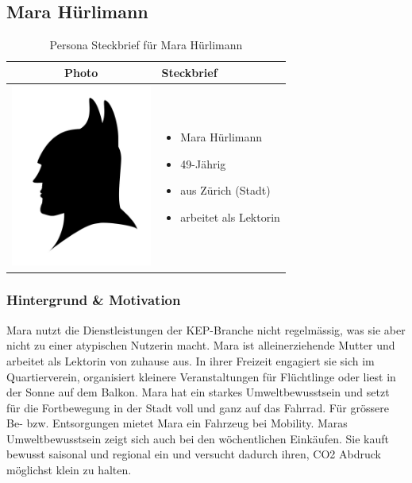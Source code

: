 \subsection{Mara Hürlimann}

\begin{table}[h!]
  \centering
  \begin{tabular}{ | c | m{5cm} | }
    \hline
    Photo & Steckbrief \\ \hline
    \begin{minipage}{.3\textwidth}
      \includegraphics[width=\linewidth, height=60mm]{images/batman.jpg}
    \end{minipage}
    &
      \begin{itemize}
        \item Mara Hürlimann
        \item 49-Jährig
        \item aus Zürich (Stadt)
        \item arbeitet als Lektorin
      \end{itemize}
    \\ \hline
  \end{tabular}
  \caption{Persona Steckbrief für Mara Hürlimann}\label{tbl:steckbriefmara}
\end{table}

\subsubsection{Hintergrund \& Motivation}
Mara nutzt die Dienstleistungen der KEP-Branche nicht regelmässig, was sie aber nicht zu einer atypischen Nutzerin macht. Mara ist alleinerziehende Mutter und arbeitet als Lektorin von zuhause aus. In ihrer Freizeit engagiert sie sich im Quartierverein, organisiert kleinere Veranstaltungen für Flüchtlinge oder liest in der Sonne auf dem Balkon. Mara hat ein starkes Umweltbewusstsein und setzt für die Fortbewegung in der Stadt voll und ganz auf das Fahrrad. Für grössere Be- bzw. Entsorgungen mietet Mara ein Fahrzeug bei Mobility. Maras Umweltbewusstsein zeigt sich auch bei den wöchentlichen Einkäufen. Sie kauft bewusst saisonal und regional ein und versucht dadurch ihren, CO2 Abdruck möglichst klein zu halten.

